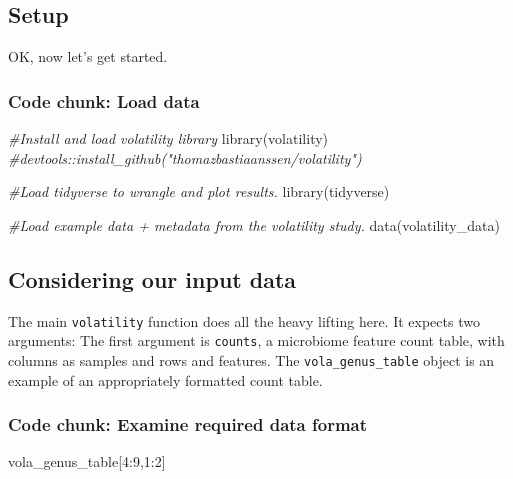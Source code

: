 \documentclass[
]{article}
\newenvironment{Shaded}{\begin{snugshade}}{\end{snugshade}}
\newcommand{\CommentTok}[1]{\textcolor[rgb]{0.56,0.35,0.01}{\textit{#1}}}
\newcommand{\DecValTok}[1]{\textcolor[rgb]{0.00,0.00,0.81}{#1}}
\newcommand{\FunctionTok}[1]{\textcolor[rgb]{0.00,0.00,0.00}{#1}}
\newcommand{\NormalTok}[1]{#1}
\newcommand{\SpecialCharTok}[1]{\textcolor[rgb]{0.00,0.00,0.00}{#1}}
\begin{document}
\hypertarget{setup}{%
\subsection{Setup}\label{setup}}

OK, now let's get started.

\hypertarget{code-chunk-load-data}{%
\subsubsection{Code chunk: Load data}\label{code-chunk-load-data}}

\begin{Shaded}
\begin{Highlighting}[]
\CommentTok{\#Install and load volatility library}
\FunctionTok{library}\NormalTok{(volatility)     }\CommentTok{\#devtools::install\_github("thomazbastiaanssen/volatility")}

\CommentTok{\#Load tidyverse to wrangle and plot results.}
\FunctionTok{library}\NormalTok{(tidyverse)}

\CommentTok{\#Load example data + metadata from the volatility study.}
\FunctionTok{data}\NormalTok{(volatility\_data)}
\end{Highlighting}
\end{Shaded}

\newpage

\hypertarget{considering-our-input-data}{%
\subsection{Considering our input
data}\label{considering-our-input-data}}

The main \texttt{volatility} function does all the heavy lifting here.
It expects two arguments: The first argument is \texttt{counts}, a
microbiome feature count table, with columns as samples and rows and
features. The \texttt{vola\_genus\_table} object is an example of an
appropriately formatted count table.

\hypertarget{code-chunk-examine-required-data-format}{%
\subsubsection{Code chunk: Examine required data
format}\label{code-chunk-examine-required-data-format}}

\begin{Shaded}
\begin{Highlighting}[]
\NormalTok{vola\_genus\_table[}\DecValTok{4}\SpecialCharTok{:}\DecValTok{9}\NormalTok{,}\DecValTok{1}\SpecialCharTok{:}\DecValTok{2}\NormalTok{]}
\end{Highlighting}
\end{Shaded}
\end{document}
